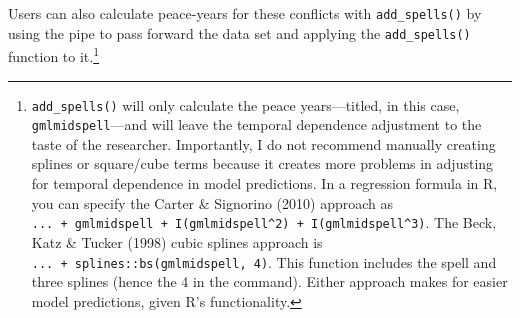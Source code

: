 \documentclass[
  11pt,
]{article}
\begin{document}
Users can also calculate peace-years for these conflicts with \texttt{add\_spells()} by using the pipe to pass forward the data set and applying the \texttt{add\_spells()} function to it.\footnote{\texttt{add\_spells()} will only calculate the peace years---titled, in this case, \texttt{gmlmidspell}---and will leave the temporal dependence adjustment to the taste of the researcher. Importantly, I do not recommend manually creating splines or square/cube terms because it creates more problems in adjusting for temporal dependence in model predictions. In a regression formula in R, you can specify the Carter \& Signorino (2010) approach as \texttt{...\ +\ gmlmidspell\ +\ I(gmlmidspell\^{}2)\ +\ I(gmlmidspell\^{}3)}. The Beck, Katz \& Tucker (1998) cubic splines approach is \texttt{...\ +\ splines::bs(gmlmidspell,\ 4)}. This function includes the spell and three splines (hence the 4 in the command). Either approach makes for easier model predictions, given R's functionality.}
\end{document}
